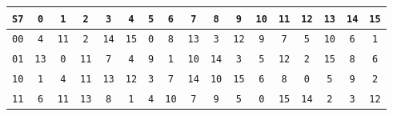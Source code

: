 \documentclass{article}
\begin{document}
\begin{center}
\vspace{10pt}
\begin{tabular}{|c|cccccccccccccccc|}
  \hline
\texttt{S7} & \texttt{0} & \texttt{1} & \texttt{2} & \texttt{3} & \texttt{4} & \texttt{5} & \texttt{6} & \texttt{7} & \texttt{8} & \texttt{9} & \texttt{10} & \texttt{11} & \texttt{12} & \texttt{13} & \texttt{14} & \texttt{15} \\
\hline
\texttt{0}\texttt{0} & \texttt{4} & \texttt{1}\texttt{1} & \texttt{2} & \texttt{1}\texttt{4} & \texttt{1}\texttt{5} & \texttt{0} & \texttt{8} & \texttt{1}\texttt{3} & \texttt{3} & \texttt{1}\texttt{2} & \texttt{9} & \texttt{7} & \texttt{5} & \texttt{1}\texttt{0} & \texttt{6} & \texttt{1} \\
\texttt{0}\texttt{1} & \texttt{1}\texttt{3} & \texttt{0} & \texttt{1}\texttt{1} & \texttt{7} & \texttt{4} & \texttt{9} & \texttt{1} & \texttt{1}\texttt{0} & \texttt{1}\texttt{4} & \texttt{3} & \texttt{5} & \texttt{1}\texttt{2} & \texttt{2} & \texttt{1}\texttt{5} & \texttt{8} & \texttt{6} \\
\texttt{1}\texttt{0} & \texttt{1} & \texttt{4} & \texttt{1}\texttt{1} & \texttt{1}\texttt{3} & \texttt{1}\texttt{2} & \texttt{3} & \texttt{7} & \texttt{1}\texttt{4} & \texttt{1}\texttt{0} & \texttt{1}\texttt{5} & \texttt{6} & \texttt{8} & \texttt{0} & \texttt{5} & \texttt{9} & \texttt{2} \\
\texttt{1}\texttt{1} & \texttt{6} & \texttt{1}\texttt{1} & \texttt{1}\texttt{3} & \texttt{8} & \texttt{1} & \texttt{4} & \texttt{1}\texttt{0} & \texttt{7} & \texttt{9} & \texttt{5} & \texttt{0} & \texttt{1}\texttt{5} & \texttt{1}\texttt{4} & \texttt{2} & \texttt{3} & \texttt{1}\texttt{2} \\
\hline
\end{tabular}


\end{center}
\end{document}
